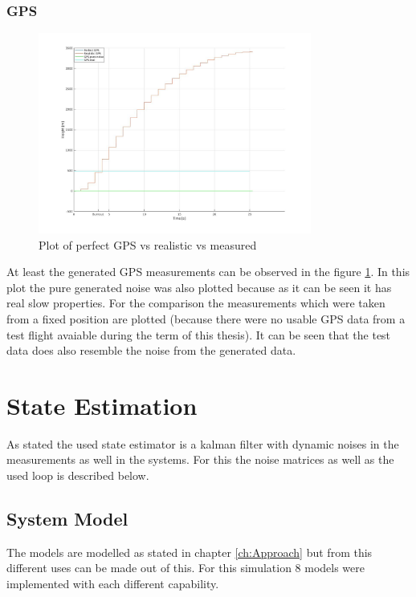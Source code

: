 \subsubsection{GPS}
\begin{figure}[h!]
 \centering
 \includegraphics[width=0.8\textwidth]{./Pictures/GPSPerfVSReal.jpg}
 \caption{Plot of perfect GPS vs realistic vs measured}
 \label{fig:GPSPerfVSReal}
\end{figure}
At least the generated GPS measurements can be observed in the figure \ref{fig:GPSPerfVSReal}.
In this plot the pure generated noise was also plotted because as it can be seen it has real slow properties.
For the comparison the measurements which were taken from a fixed position are plotted (because there were no usable GPS data from a test flight avaiable during the term of this thesis).
It can be seen that the test data does also resemble the noise from the generated data.


\section{State Estimation}
As stated the used state estimator is a kalman filter with dynamic noises in the measurements as well in the systems.
For this the noise matrices as well as the used loop is described below.

\subsection{System Model}
The models are modelled as stated in chapter \ref{ch:Approach} but from this different uses can be made out of this.
For this simulation 8 models were implemented with each different capability.

